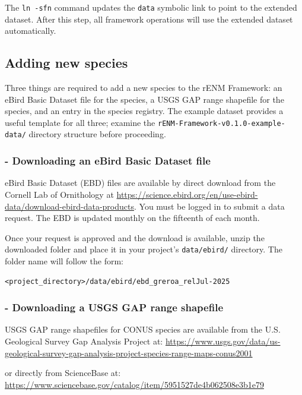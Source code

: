 \documentclass[
  letterpaper,
  DIV=11,
  numbers=noendperiod]{scrartcl}
\begin{document}
The \texttt{ln\ -sfn} command updates the \texttt{data} symbolic link to
point to the extended dataset. After this step, all framework operations
will use the extended dataset automatically.

\subsection{Adding new species}\label{adding-new-species}

Three things are required to add a new species to the rENM Framework: an
eBird Basic Dataset file for the species, a USGS GAP range shapefile for
the species, and an entry in the species registry. The example dataset
provides a useful template for all three; examine the
\texttt{rENM-Framework-v0.1.0-example-data/} directory structure before
proceeding.

\subsubsection{- Downloading an eBird Basic Dataset
file}\label{downloading-an-ebird-basic-dataset-file}

eBird Basic Dataset (EBD) files are available by direct download from
the Cornell Lab of Ornithology at
\url{https://science.ebird.org/en/use-ebird-data/download-ebird-data-products}.
You must be logged in to submit a data request. The EBD is updated
monthly on the fifteenth of each month.

Once your request is approved and the download is available, unzip the
downloaded folder and place it in your project's \texttt{data/ebird/}
directory. The folder name will follow the form:

\begin{verbatim}
<project_directory>/data/ebird/ebd_greroa_relJul-2025
\end{verbatim}

\subsubsection{- Downloading a USGS GAP range
shapefile}\label{downloading-a-usgs-gap-range-shapefile}

USGS GAP range shapefiles for CONUS species are available from the U.S.
Geological Survey Gap Analysis Project at:
\url{https://www.usgs.gov/data/us-geological-survey-gap-analysis-project-species-range-maps-conus2001}

or directly from ScienceBase at:
\url{https://www.sciencebase.gov/catalog/item/5951527de4b062508e3b1e79}
\end{document}
